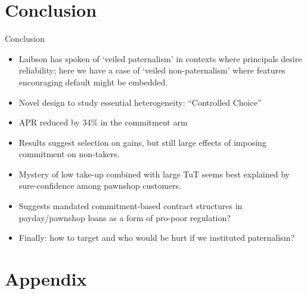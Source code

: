 \documentclass[8pt]{beamer}
\begin{document}
\section{Conclusion}
\begin{frame}{Conclusion}
    \begin{itemize}
     \vfill \item Laibson has spoken of `veiled paternalism' in contexts where principals desire reliability; here we have a case of `veiled non-paternalism' where features encouraging default might be embedded.
     \vfill \item Novel design to study essential heterogeneity: ``Controlled Choice''
        \vfill \item  APR reduced by 34\% in the commitment arm
        \vfill  \item Results suggest selection on gains, but still large effects of imposing commitment on non-takers.
        \vfill \item Mystery of low take-up combined with large TuT seems best explained by sure-confidence among pawnshop customers.
        
        \vfill \item Suggests mandated commitment-based contract structures in payday/pawnshop loans as a form of pro-poor regulation?
        \vfill\item Finally:  how to target and who would be hurt if we instituted  paternalism? 
        
    \end{itemize}  
\end{frame}

\appendix



\section{Appendix}
\end{document}
